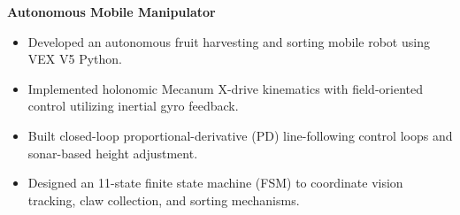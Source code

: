 \textbf{Autonomous Mobile Manipulator}
\begin{itemize}
  \item Developed an autonomous fruit harvesting and sorting mobile robot using VEX V5 Python.
  \item Implemented holonomic Mecanum X-drive kinematics with field-oriented control utilizing inertial gyro feedback.
  \item Built closed-loop proportional-derivative (PD) line-following control loops and sonar-based height adjustment.
  \item Designed an 11-state finite state machine (FSM) to coordinate vision tracking, claw collection, and sorting mechanisms.
\end{itemize}
